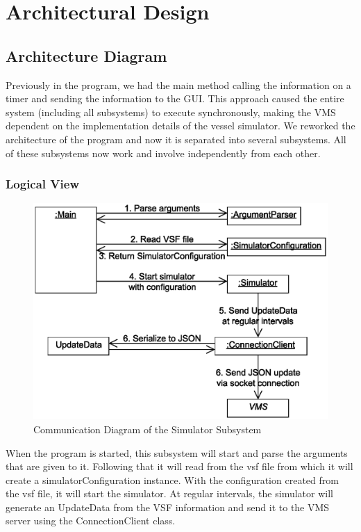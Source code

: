 \documentclass{article}
\begin{document}
\section{Architectural Design} %

\subsection{Architecture Diagram} %
Previously in the program, we had the main method calling the information on a timer and sending the information to the GUI. 
This approach caused the entire system (including all subsystems) to execute synchronously, making the VMS dependent on the implementation details of the vessel simulator.
We reworked the architecture of the program and now it is separated into several subsystems.
All of these subsystems now work and involve independently from each other.
\subsubsection{Logical View} %
\begin{figure}[!htb]
\caption{Communication Diagram of the Simulator Subsystem}
\centering
\includegraphics[scale=0.5]{diagrams/simulator-communication-diagram.eps}
\end{figure}
When the program is started, this subsystem will start and parse the arguments that are given to it. Following that it will read from the vsf file from which it will create a simulatorConfiguration instance. With the configuration created from the vsf file, it will start the simulator. At regular intervals, the simulator will generate an UpdateData from the VSF information and send it to the VMS server using the ConnectionClient class.
\end{document}
